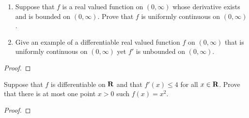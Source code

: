 \documentclass[11pt,twoside,openany]{memoir}
\begin{document}
\newpage
\fancyhead[L]{\scalebox{0.9}{Derivatives and the Mean Value Theorem}}
\fancyhead[R]{\scalebox{0.9}{Appeared on: W19}}
\begin{problem}
    \phantom{a}
    \begin{enumerate}[label = (\arabic*)]
        \item Suppose that $f$ is a real valued function on $(0,\infty)$ whose derivative exists and is bounded on $(0,\infty)$. Prove that $f$ is uniformly continuous on $(0,\infty)$.
        \item Give an example of a differentiable real valued function $f$ on $(0,\infty)$ that is uniformly continuous on $(0,\infty)$ yet $f'$ is unbounded on $(0,\infty)$.
    \end{enumerate}
\end{problem}
\begin{proof}
\end{proof}

\newpage
\fancyhead[L]{\scalebox{0.9}{Derivatives and the Mean Value Theorem}}
\fancyhead[R]{\scalebox{0.9}{Appeared on: F18}}
\begin{problem}
    Suppose that $f$ is differentiable on $\mathbf{R}$ and that $f'(x) \leq 4$ for all $x \in \mathbf{R}$. Prove that there is at most one point $x>0$ such $f(x) = x^2$.
\end{problem}
\begin{proof}
\end{proof}
\end{document}
